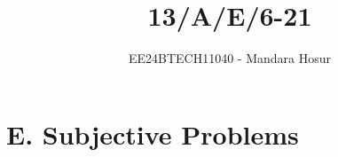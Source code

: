 \documentclass[journal]{IEEEtran}
\begin{document}

\vspace{3cm}

\title{13/A/E/6-21}
\author{EE24BTECH11040 - Mandara Hosur}
{\let\newpage\relax\maketitle}

\renewcommand{\thefigure}{\theenumi}
\renewcommand{\thetable}{\theenumi}
\setlength{\intextsep}{10pt} %


\renewcommand{\thetable}{\theenumi}

\section*{\textbf{E. Subjective Problems}}
\end{document}
